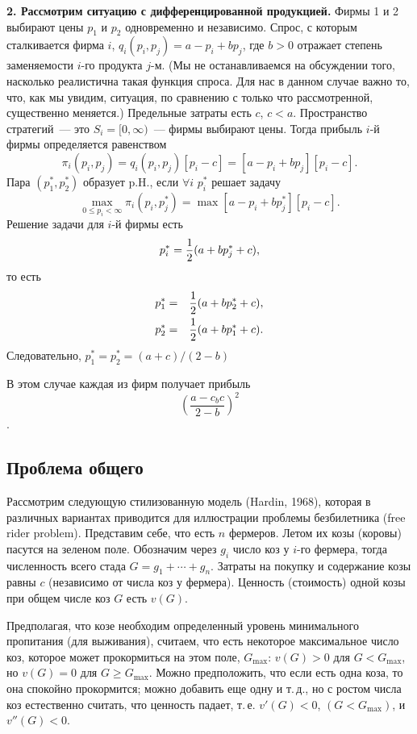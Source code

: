 \documentclass[12pt]{article}
\begin{document}
{{\bf 2. Рассмотрим ситуацию с дифференцированной продукцией.} Фирмы
1 и  2 выбирают цены $p_1$ и $p_2$ одновременно и независимо. Спрос,
с которым сталкивается фирма $i$, $q_i(p_i,p_j)=a-p_i+bp_j$, где
$b>0$ отражает степень заменяемости $i$-го продукта $j$-м.  (Мы не
останавливаемся на обсуждении того, насколько реалистична такая
функция спроса. Для нас в данном случае важно то, что, как мы увидим,
ситуация, по сравнению с только что рассмотренной, существенно
меняется.) Предельные
затраты  есть $c$, $c<a$. Пространство стратегий~--- это
$S_i=[0,\infty)$~---  фирмы выбирают цены.  Тогда прибыль  $i$-й
фирмы определяется равенством
$$
\pi_i(p_i,p_j)=q_i(p_i,p_j)[p_i-c]=[a-p_i+bp_j][p_i-c].
$$
Пара $(p^*_1,p^*_2)$ образует p.H., если $\forall i$ $p^*_i$ решает
задачу
$$
\max_{0\le p_i<\infty}\pi_i(p_i,p^*_j)=\max[a-p_i+bp^*_j][p_i-c].
$$
Решение задачи для $i$-й фирмы есть
$$
p^*_i={1\over 2}(a+bp^*_j+c),
$$
то есть
\begin{eqnarray}
p^*_1&=&{1\over 2}(a+bp^*_2+c),\nonumber\\
p^*_2&=&{1\over 2}(a+bp^*_1+c).\nonumber
\end{eqnarray}
Следовательно, $p^*_1=p^*_2=(a+c)/(2-b)$
\smallskip

В этом случае каждая из фирм получает прибыль
$$(\frac{a-c_bc}{2-b})^2$$.

\subsection{Проблема общего}

Рассмотрим следующую стилизованную модель (Hardin, 1968), которая
в различных вариантах приводится для иллюстрации проблемы безбилетника
(free rider problem).
Представим себе, что есть $n$ фермеров. Летом их козы (коровы)
пасутся на зеленом поле. Обозначим через $g_i$ число коз у $i$-го
фермера, тогда численность всего стада $G=g_1+\cdots+g_n$.  Затраты
на покупку и содержание козы равны $c$ (независимо от числа коз у
фермера). Ценность (стоимость) одной козы при общем числе коз $G$
есть $v(G)$.

Предполагая, что козе необходим определенный уровень минимального
пропитания (для выживания), считаем, что есть некоторое максимальное
число коз, которое может прокормиться на этом поле,  $G_{\max}$: $v(G)>0$ для
$G<G_{\max}$, но $v(G)=0$ для $G\ge G_{\max}$. Можно предположить,
что если есть одна коза, то  она спокойно прокормится; можно
добавить еще одну и т.\,д., но с ростом числа коз естественно
считать, что ценность падает, т.\,е. $v'(G)<0$, $(G<G_{\max})$,  и
$v''(G)<0$.

}
\end{document}
